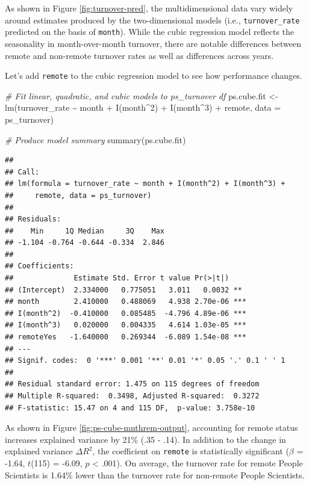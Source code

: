 \documentclass[
]{book}
\newenvironment{Shaded}{\begin{snugshade}}{\end{snugshade}}
\newcommand{\AttributeTok}[1]{\textcolor[rgb]{0.77,0.63,0.00}{#1}}
\newcommand{\CommentTok}[1]{\textcolor[rgb]{0.56,0.35,0.01}{\textit{#1}}}
\newcommand{\DecValTok}[1]{\textcolor[rgb]{0.00,0.00,0.81}{#1}}
\newcommand{\FunctionTok}[1]{\textcolor[rgb]{0.00,0.00,0.00}{#1}}
\newcommand{\NormalTok}[1]{#1}
\newcommand{\OtherTok}[1]{\textcolor[rgb]{0.56,0.35,0.01}{#1}}
\newcommand{\SpecialCharTok}[1]{\textcolor[rgb]{0.00,0.00,0.00}{#1}}
\begin{document}
As shown in Figure \ref{fig:turnover-pred}, the multidimensional data vary widely around estimates produced by the two-dimensional models (i.e., \texttt{turnover\_rate} predicted on the basis of \texttt{month}). While the cubic regression model reflects the seasonality in month-over-month turnover, there are notable differences between remote and non-remote turnover rates as well as differences across years.

Let's add \texttt{remote} to the cubic regression model to see how performance changes.

\begin{Shaded}
\begin{Highlighting}[]
\CommentTok{\# Fit linear, quadratic, and cubic models to ps\_turnover df}
\NormalTok{ps.cube.fit }\OtherTok{\textless{}{-}} \FunctionTok{lm}\NormalTok{(turnover\_rate }\SpecialCharTok{\textasciitilde{}}\NormalTok{ month }\SpecialCharTok{+} \FunctionTok{I}\NormalTok{(month}\SpecialCharTok{\^{}}\DecValTok{2}\NormalTok{) }\SpecialCharTok{+} \FunctionTok{I}\NormalTok{(month}\SpecialCharTok{\^{}}\DecValTok{3}\NormalTok{) }\SpecialCharTok{+}\NormalTok{ remote, }\AttributeTok{data =}\NormalTok{ ps\_turnover)}

\CommentTok{\# Produce model summary}
\FunctionTok{summary}\NormalTok{(ps.cube.fit)}
\end{Highlighting}
\end{Shaded}

\begin{verbatim}
## 
## Call:
## lm(formula = turnover_rate ~ month + I(month^2) + I(month^3) + 
##     remote, data = ps_turnover)
## 
## Residuals:
##    Min     1Q Median     3Q    Max 
## -1.104 -0.764 -0.644 -0.334  2.846 
## 
## Coefficients:
##              Estimate Std. Error t value Pr(>|t|)    
## (Intercept)  2.334000   0.775051   3.011   0.0032 ** 
## month        2.410000   0.488069   4.938 2.70e-06 ***
## I(month^2)  -0.410000   0.085485  -4.796 4.89e-06 ***
## I(month^3)   0.020000   0.004335   4.614 1.03e-05 ***
## remoteYes   -1.640000   0.269344  -6.089 1.54e-08 ***
## ---
## Signif. codes:  0 '***' 0.001 '**' 0.01 '*' 0.05 '.' 0.1 ' ' 1
## 
## Residual standard error: 1.475 on 115 degrees of freedom
## Multiple R-squared:  0.3498, Adjusted R-squared:  0.3272 
## F-statistic: 15.47 on 4 and 115 DF,  p-value: 3.758e-10
\end{verbatim}

As shown in Figure \ref{fig:ps-cube-mnthrem-output}, accounting for remote status increases explained variance by 21\% (.35 - .14). In addition to the change in explained variance \(\Delta R^2\), the coefficient on \texttt{remote} is statistically significant (\(\beta\) = -1.64, \(t\)(115) = -6.09, \(p\) \textless{} .001). On average, the turnover rate for remote People Scientists is 1.64\% lower than the turnover rate for non-remote People Scientists.
\end{document}
